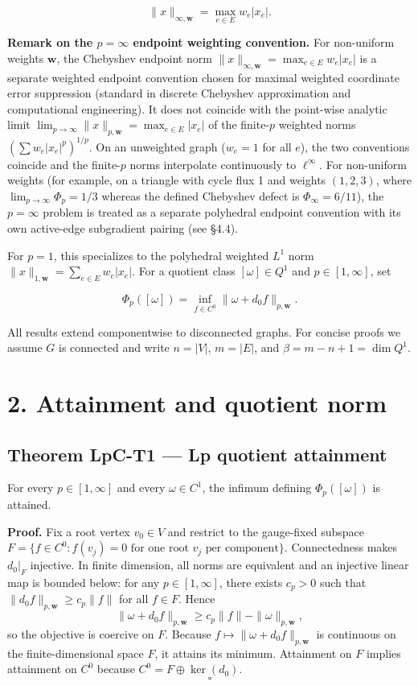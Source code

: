 \documentclass[
]{article}
\begin{document}
\[\|x\|_{\infty,\mathbf{w}} = \max_{e \in E} w_e |x_e|.\]

\textbf{Remark on the \(p=\infty\) endpoint weighting convention.} For non-uniform weights \(\mathbf{w}\), the Chebyshev endpoint norm \(\|x\|_{\infty,\mathbf{w}} = \max_{e \in E} w_e |x_e|\) is a separate weighted endpoint convention chosen for maximal weighted coordinate error suppression (standard in discrete Chebyshev approximation and computational engineering). It does not coincide with the point-wise analytic limit \(\lim_{p \to \infty} \|x\|_{p,\mathbf{w}} = \max_{e \in E} |x_e|\) of the finite-\(p\) weighted norms \((\sum w_e |x_e|^p)^{1/p}\). On an unweighted graph (\(w_e = 1\) for all \(e\)), the two conventions coincide and the finite-\(p\) norms interpolate continuously to \(\ell^\infty\). For non-uniform weights (for example, on a triangle with cycle flux 1 and weights \((1,2,3)\), where \(\lim_{p\to\infty}\Phi_p = 1/3\) whereas the defined Chebyshev defect is \(\Phi_\infty = 6/11\)), the \(p = \infty\) problem is treated as a separate polyhedral endpoint convention with its own active-edge subgradient pairing (see §4.4).

For \(p = 1\), this specializes to the polyhedral weighted \(L^1\) norm \(\|x\|_{1,\mathbf{w}} = \sum_{e \in E} w_e |x_e|\).
For a quotient class \([\omega] \in Q^1\) and \(p \in [1, \infty]\), set

\[\Phi_p([\omega]) = \inf_{f \in C^0} \|\omega + d_0 f\|_{p,\mathbf{w}}.\]

All results extend componentwise to disconnected graphs. For concise proofs we
assume \(G\) is connected and write \(n = |V|\), \(m = |E|\), and
\(\beta = m - n + 1 = \dim Q^1\).

\section{2. Attainment and quotient norm}\label{attainment-and-quotient-norm}

\subsection{Theorem LpC-T1 --- Lp quotient attainment}\label{theorem-lpc-t1-lp-quotient-attainment}

For every \(p \in [1, \infty]\) and every \(\omega \in C^1\), the infimum defining \(\Phi_p([\omega])\) is attained.

\textbf{Proof.} Fix a root vertex \(v_0 \in V\) and restrict to the gauge-fixed subspace
\(F = \{f \in C^0 : f(v_j) = 0\text{ for one root }v_j\text{ per component}\}\). Connectedness makes \(d_0|_F\) injective. In finite dimension,
all norms are equivalent and an injective linear map is bounded below: for any \(p \in [1, \infty]\),
there exists \(c_p > 0\) such that \(\|d_0 f\|_{p,\mathbf{w}} \ge c_p \|f\|\) for all \(f \in F\). Hence
\[\|\omega + d_0 f\|_{p,\mathbf{w}} \ge c_p \|f\| - \|\omega\|_{p,\mathbf{w}},\]
so the objective is coercive on \(F\). Because \(f \mapsto \|\omega + d_0 f\|_{p,\mathbf{w}}\) is continuous
on the finite-dimensional space \(F\), it attains its minimum. Attainment on \(F\) implies attainment
on \(C^0\) because \(C^0 = F \oplus \ker(d_0)\). \[\square\]
\end{document}
